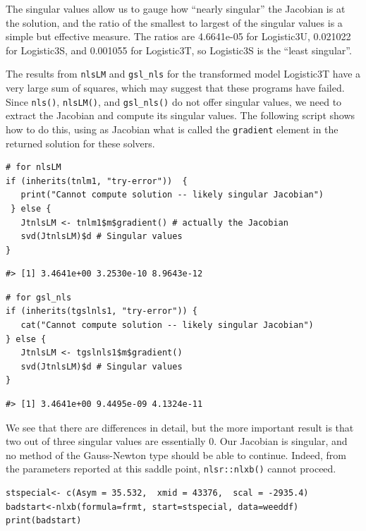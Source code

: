 The singular values allow us to gauge how ``nearly singular'' the
Jacobian is at the solution, and the ratio of the smallest to largest of the
singular values is a simple but effective measure. The ratios are
4.6641e-05 for Logistic3U, 0.021022 for Logistic3S, and 0.001055 for
Logistic3T, so Logistic3S is the ``least singular''.

The results from \texttt{nlsLM} and \texttt{gsl\_nls} for the transformed model Logistic3T have a very
large sum of squares, which may suggest that these programs have failed.
Since \texttt{nls()}, \texttt{nlsLM()}, and \texttt{gsl\_nls()} do not
offer singular values, we need to extract the Jacobian and compute its
singular values. The following script shows how to do this, using as Jacobian what is called
the \texttt{gradient} element in the returned solution for these solvers.

\begin{verbatim}
# for nlsLM
if (inherits(tnlm1, "try-error"))  {
   print("Cannot compute solution -- likely singular Jacobian")
 } else {  
   JtnlsLM <- tnlm1$m$gradient() # actually the Jacobian
   svd(JtnlsLM)$d # Singular values
}   
\end{verbatim}

\begin{verbatim}
#> [1] 3.4641e+00 3.2530e-10 8.9643e-12
\end{verbatim}

\begin{verbatim}
# for gsl_nls
if (inherits(tgslnls1, "try-error")) {
   cat("Cannot compute solution -- likely singular Jacobian")
} else {  
   JtnlsLM <- tgslnls1$m$gradient()
   svd(JtnlsLM)$d # Singular values
}   
\end{verbatim}

\begin{verbatim}
#> [1] 3.4641e+00 9.4495e-09 4.1324e-11
\end{verbatim}

We see that there are differences in detail, but the more important result is that
two out of three singular values are essentially 0. Our Jacobian is singular, and no
method of the Gauss-Newton type should be able to continue. Indeed, from the parameters
reported at this saddle point, \texttt{nlsr::nlxb()} cannot proceed.

\begin{verbatim}
stspecial<- c(Asym = 35.532,  xmid = 43376,  scal = -2935.4)
badstart<-nlxb(formula=frmt, start=stspecial, data=weeddf)
print(badstart)
\end{verbatim}

